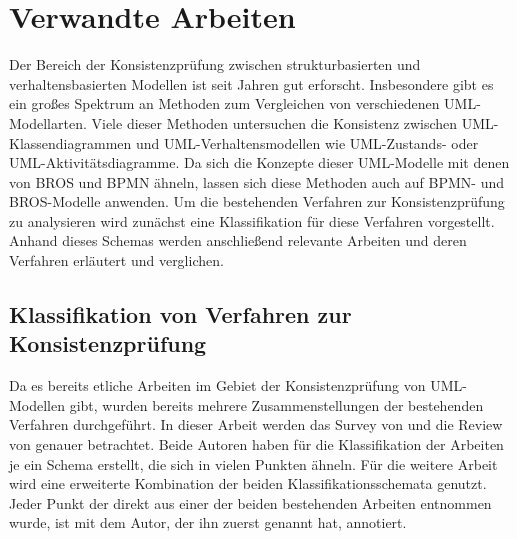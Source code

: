 \chapter{Verwandte Arbeiten}
\label{chap:related_work}

Der Bereich der Konsistenzprüfung zwischen strukturbasierten und verhaltensbasierten Modellen ist seit Jahren gut erforscht.
Insbesondere gibt es ein großes Spektrum an Methoden zum Vergleichen von verschiedenen UML-Modellarten.
Viele dieser Methoden untersuchen die Konsistenz zwischen UML-Klassendiagrammen und UML-Verhaltensmodellen wie UML-Zustands- oder UML-Aktivitätsdiagramme.
Da sich die Konzepte dieser UML-Modelle mit denen von BROS und BPMN ähneln, lassen sich diese Methoden auch auf BPMN- und BROS-Modelle anwenden.
Um die bestehenden Verfahren zur Konsistenzprüfung zu analysieren wird zunächst eine Klassifikation für diese Verfahren vorgestellt.
Anhand dieses Schemas werden anschließend relevante Arbeiten und deren Verfahren erläutert und verglichen.

\section{Klassifikation von Verfahren zur Konsistenzprüfung}

Da es bereits etliche Arbeiten im Gebiet der Konsistenzprüfung von UML-Modellen gibt, wurden bereits mehrere Zusammenstellungen der bestehenden Verfahren durchgeführt.
In dieser Arbeit werden das Survey von \cite{Usman2008} und die Review von \cite{Lucas2009} genauer betrachtet.
Beide Autoren haben für die Klassifikation der Arbeiten je ein Schema erstellt, die sich in vielen Punkten ähneln.
Für die weitere Arbeit wird eine erweiterte Kombination der beiden Klassifikationsschemata genutzt.
Jeder Punkt der direkt aus einer der beiden bestehenden Arbeiten entnommen wurde, ist mit dem Autor, der ihn zuerst genannt hat, annotiert.

